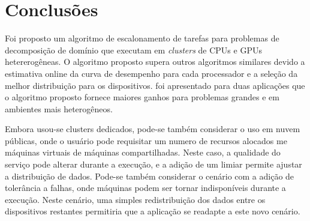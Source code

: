 \section{Conclusões}\label{cap6:conclusao}

Foi proposto um algoritmo de escalonamento de tarefas para problemas de decomposição de domínio que executam em \emph{clusters} de CPUs e GPUs hetererogêneas. O algoritmo proposto supera outros algoritmos similares devido a estimativa online da curva de desempenho para cada  processador e a seleção da melhor distribuição para os dispositivos. foi apresentado para duas aplicações que o algoritmo proposto fornece maiores ganhos para problemas grandes e em ambientes mais heterogêneos.

Embora usou-se clusters dedicados, pode-se também considerar o uso em nuvem públicas, onde o usuário pode requisitar um numero de recursos alocados me máquinas virtuais de máquinas compartilhadas. Neste caso, a qualidade do serviço pode alterar durante a execução, e a adição de um limiar permite ajustar a distribuição de dados. Pode-se também considerar o cenário com a adição de tolerância a falhas, onde máquinas podem ser tornar indisponíveis durante a execução. Neste cenário, uma simples redistribuição dos dados entre os dispositivos restantes permitiria que a aplicação se readapte a este novo cenário.





